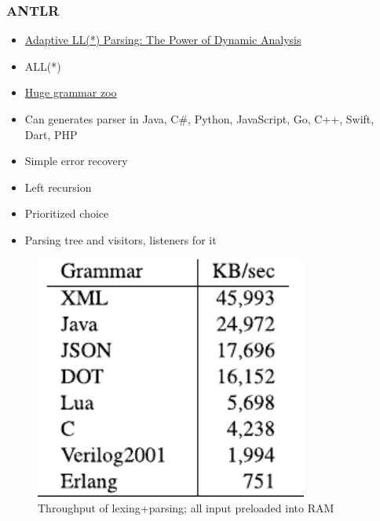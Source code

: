 \documentclass[xcolor=table,aspectratio=169]{beamer}
\begin{document}
\begin{frame}[fragile]
  \frametitle{ANTLR}  
  \begin{minipage}[t]{0.48\textwidth}
  \begin{itemize}
    \item \href{https://www.antlr.org/papers/allstar-techreport.pdf}{Adaptive LL(*) Parsing: The Power of Dynamic Analysis}
    \item ALL(*)
    \item \href{https://github.com/antlr/grammars-v4}{Huge grammar zoo}
    \item Can generates parser in Java, C\#, Python, JavaScript, Go, C++, Swift, Dart, PHP
    \item[\faPlus] Simple error recovery
    \item[\faPlus] Left recursion
    \item[\faPlus] Prioritized choice
    \item[\faPlus] Parsing tree and visitors, listeners for it
  \end{itemize}
\end{minipage}
\begin{minipage}[t]{0.48\textwidth}
  \begin{figure}
    \includegraphics[width=0.8\textwidth]{pictures/antlrPerformance.pdf}
    \caption{Throughput of lexing+parsing; all input preloaded into RAM\footnotemark}
  \end{figure}
\end{minipage}
\end{frame}
\end{document}
